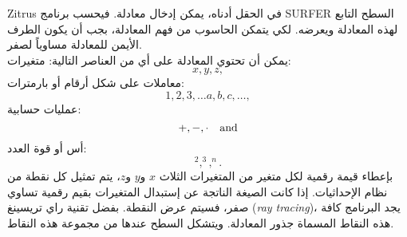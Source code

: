 \begin{surferPage}{Zitrus}
في الحقل أدناه، يمكن إدخال معادلة. فيحسب برنامج SURFER السطح التابع لهذه المعادلة ويعرضه. لكي يتمكن الحاسوب من فهم المعادلة، بجب أن يكون الطرف الأيمن للمعادلة مساوياً لصفر.
\\
يمكن أن تحتوي المعادلة على أي من العناصر التالية:
\newline
متغيرات:
\[x, y, z, \]
معاملات على شكل أرقام أو بارمترات:
\[1, 2, 3, \dots a, b, c, \dots, \]
عمليات حسابية:
\[+,  - , \cdot \quad \textnormal{and} \]
أس أو قوة العدد:
\[ ^2, ^3, ^n .\]
بإعطاء قيمة رقمية لكل متغير من المتغيرات الثلاث $x$ و$y$ و$z$، يتم تمثيل كل نقطة من نظام الإحداثيات. إذا كانت الصيغة الناتجة عن إستبدال المتغيرات بقيم رقمية تساوي صفر، فسيتم عرض النقطة. بفضل تقنية راي تريسينغ (\textit{ray tracing})، يجد البرنامج كافة هذه النقاط المسماة جذور المعادلة. ويتشكل السطح عندها من مجموعة هذه النقاط.
\end{surferPage}
